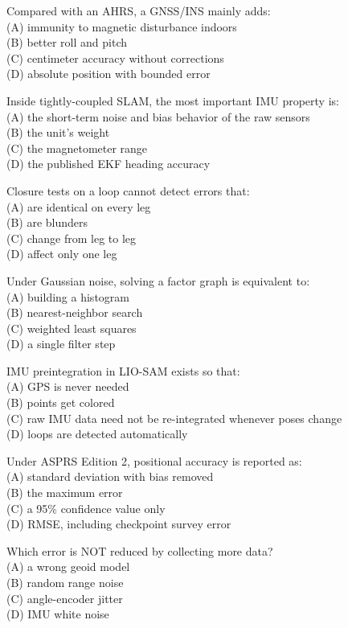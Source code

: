 \item Compared with an AHRS, a GNSS/INS mainly adds:\\[1pt] (A) immunity to magnetic disturbance indoors\\ (B) better roll and pitch\\ (C) centimeter accuracy without corrections\\ (D) absolute position with bounded error
\item Inside tightly-coupled SLAM, the most important IMU property is:\\[1pt] (A) the short-term noise and bias behavior of the raw sensors\\ (B) the unit's weight\\ (C) the magnetometer range\\ (D) the published EKF heading accuracy
\item Closure tests on a loop cannot detect errors that:\\[1pt] (A) are identical on every leg\\ (B) are blunders\\ (C) change from leg to leg\\ (D) affect only one leg
\item Under Gaussian noise, solving a factor graph is equivalent to:\\[1pt] (A) building a histogram\\ (B) nearest-neighbor search\\ (C) weighted least squares\\ (D) a single filter step
\item IMU preintegration in LIO-SAM exists so that:\\[1pt] (A) GPS is never needed\\ (B) points get colored\\ (C) raw IMU data need not be re-integrated whenever poses change\\ (D) loops are detected automatically
\item Under ASPRS Edition 2, positional accuracy is reported as:\\[1pt] (A) standard deviation with bias removed\\ (B) the maximum error\\ (C) a 95\% confidence value only\\ (D) RMSE, including checkpoint survey error
\item Which error is NOT reduced by collecting more data?\\[1pt] (A) a wrong geoid model\\ (B) random range noise\\ (C) angle-encoder jitter\\ (D) IMU white noise
